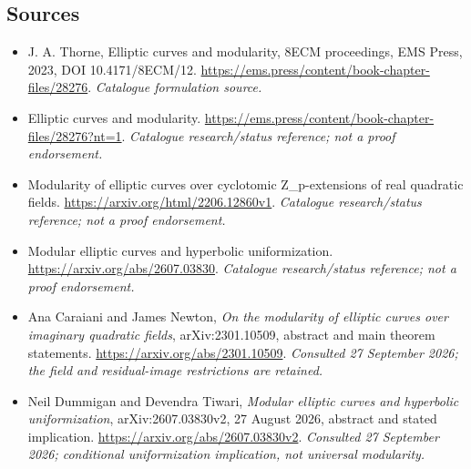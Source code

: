 \documentclass[11pt,a4paper]{article}
\numberwithin{equation}{section}
\begin{document}

\subsection{Sources}
\begin{itemize}\raggedright
\item[\textnormal{[S1]}]\hypertarget{source:statement:1}{} J. A. Thorne, Elliptic curves and modularity, 8ECM proceedings, EMS Press, 2023, DOI 10.4171/8ECM/12.
\url{https://ems.press/content/book-chapter-files/28276}.
{\small\textit{Catalogue formulation source.}}
\item[\textnormal{[S2]}]\hypertarget{source:statement:2}{} Elliptic curves and modularity.
\url{https://ems.press/content/book-chapter-files/28276?nt=1}.
{\small\textit{Catalogue research/status reference; not a proof endorsement.}}
\item[\textnormal{[S3]}]\hypertarget{source:statement:3}{} Modularity of elliptic curves over cyclotomic Z\_p-extensions of real quadratic fields.
\url{https://arxiv.org/html/2206.12860v1}.
{\small\textit{Catalogue research/status reference; not a proof endorsement.}}
\item[\textnormal{[S4]}]\hypertarget{source:statement:4}{} Modular elliptic curves and hyperbolic uniformization.
\url{https://arxiv.org/abs/2607.03830}.
{\small\textit{Catalogue research/status reference; not a proof endorsement.}}
\item[\textnormal{[E1]}]\hypertarget{extra:statement:1}{} Ana Caraiani and James Newton,
\emph{On the modularity of elliptic curves over imaginary quadratic fields},
arXiv:2301.10509, abstract and main theorem statements.
\url{https://arxiv.org/abs/2301.10509}.
{\small\textit{Consulted 27 September 2026; the field and residual-image restrictions are retained.}}
\item[\textnormal{[E2]}]\hypertarget{extra:statement:2}{} Neil Dummigan and Devendra Tiwari,
\emph{Modular elliptic curves and hyperbolic uniformization},
arXiv:2607.03830v2, 27 August 2026, abstract and stated implication.
\url{https://arxiv.org/abs/2607.03830v2}.
{\small\textit{Consulted 27 September 2026; conditional uniformization implication, not universal modularity.}}

\end{itemize}

\end{document}
